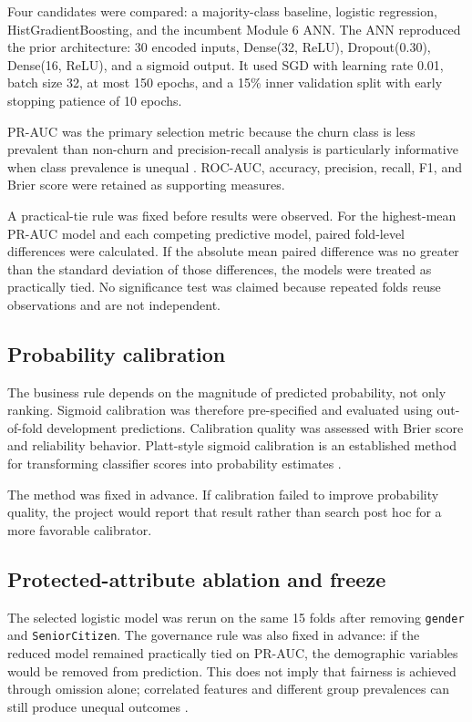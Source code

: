 \documentclass[11pt]{article}
\newcommand{\code}[1]{\texttt{#1}}
\begin{document}
Four candidates were compared: a majority-class baseline, logistic regression, HistGradientBoosting, and the incumbent Module 6 ANN. The ANN reproduced the prior architecture: 30 encoded inputs, Dense(32, ReLU), Dropout(0.30), Dense(16, ReLU), and a sigmoid output. It used SGD with learning rate 0.01, batch size 32, at most 150 epochs, and a 15\% inner validation split with early stopping patience of 10 epochs.

PR-AUC was the primary selection metric because the churn class is less prevalent than non-churn and precision-recall analysis is particularly informative when class prevalence is unequal \citep{saito2015}. ROC-AUC, accuracy, precision, recall, F1, and Brier score were retained as supporting measures.

A practical-tie rule was fixed before results were observed. For the highest-mean PR-AUC model and each competing predictive model, paired fold-level differences were calculated. If the absolute mean paired difference was no greater than the standard deviation of those differences, the models were treated as practically tied. No significance test was claimed because repeated folds reuse observations and are not independent.

\subsection{Probability calibration}

The business rule depends on the magnitude of predicted probability, not only ranking. Sigmoid calibration was therefore pre-specified and evaluated using out-of-fold development predictions. Calibration quality was assessed with Brier score and reliability behavior. Platt-style sigmoid calibration is an established method for transforming classifier scores into probability estimates \citep{niculescu2005}.

The method was fixed in advance. If calibration failed to improve probability quality, the project would report that result rather than search post hoc for a more favorable calibrator.

\subsection{Protected-attribute ablation and freeze}

The selected logistic model was rerun on the same 15 folds after removing \code{gender} and \code{SeniorCitizen}. The governance rule was also fixed in advance: if the reduced model remained practically tied on PR-AUC, the demographic variables would be removed from prediction. This does not imply that fairness is achieved through omission alone; correlated features and different group prevalences can still produce unequal outcomes \citep{fazelpour2021}.
\end{document}
